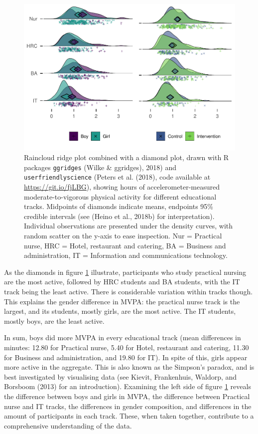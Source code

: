 \documentclass[british,man]{apa6}
\begin{document}
\begin{figure}
\centering
\includegraphics{_baseline-manuscript_files/figure-latex/MVPA-accelerometer-plot-1.pdf}
\caption{\label{fig:MVPA-accelerometer-plot}Raincloud ridge plot combined with a diamond plot, drawn with R packages \texttt{ggridges} (Wilke \& ggridges), 2018) and \texttt{userfriendlyscience} (Peters et al. (2018), code available at \url{https://git.io/fjLBG}), showing hours of accelerometer-measured moderate-to-vigorous physical activity for different educational tracks. Midpoints of diamonds indicate means, endpoints 95\% credible intervals (see (Heino et al., 2018b) for interpretation). Individual observations are presented under the density curves, with random scatter on the y-axis to ease inspection. Nur = Practical nurse, HRC = Hotel, restaurant and catering, BA = Business and administration, IT = Information and communications technology.}
\end{figure}

As the diamonds in figure \ref{fig:MVPA-accelerometer-plot} illustrate, participants who study practical nursing are the most active, followed by HRC students and BA students, with the IT track being the least active. There is considerable variation within tracks though. This explains the gender difference in MVPA: the practical nurse track is the largest, and its students, mostly girls, are the most active. The IT students, mostly boys, are the least active.

In sum, boys did more MVPA in every educational track (mean differences in minutes: 12.80 for Practical nurse, 5.40 for Hotel, restaurant and catering, 11.30 for Business and administration, and 19.80 for IT). In spite of this, girls appear more active in the aggregate. This is also known as the Simpson's paradox, and is best investigated by visualising data (see Kievit, Frankenhuis, Waldorp, and Borsboom (2013) for an introduction). Examining the left side of figure \ref{fig:MVPA-accelerometer-plot} reveals the difference between boys and girls in MVPA, the difference between Practical nurse and IT tracks, the differences in gender composition, and differences in the amount of participants in each track. These, when taken together, contribute to a comprehensive understanding of the data.
\end{document}
